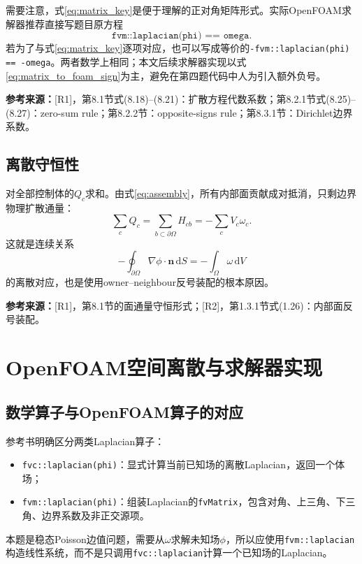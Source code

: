 \documentclass[UTF8,12pt,a4paper]{ctexart}
\numberwithin{equation}{section}
\newcommand{\dd}{\,\mathrm d}
\newcommand{\Rone}{\textnormal{[R1]}}
\newcommand{\Rtwo}{\textnormal{[R2]}}
\newcommand{\source}[1]{%
  \par\smallskip
  \noindent\colorbox{sourcebg}{%
    \parbox{0.955\linewidth}{\footnotesize\color{sourcegray}\textbf{参考来源：}#1}%
  }
  \par\smallskip
}
\begin{document}
需要注意，式\eqref{eq:matrix_key}是便于理解的正对角矩阵形式。实际OpenFOAM求解器推荐直接写题目原方程
\begin{equation}
  \texttt{fvm::laplacian(phi) == omega}.
  \label{eq:matrix_to_foam_sign}
\end{equation}
若为了与式\eqref{eq:matrix_key}逐项对应，也可以写成等价的\texttt{-fvm::laplacian(phi) == -omega}。两者数学上相同；本文后续求解器实现以式\eqref{eq:matrix_to_foam_sign}为主，避免在第四题代码中人为引入额外负号。

\source{\Rone，第8.1节式(8.18)--(8.21)：扩散方程代数系数；第8.2.1节式(8.25)--(8.27)：zero-sum rule；第8.2.2节：opposite-signs rule；第8.3.1节：Dirichlet边界系数。}

\subsection{离散守恒性}

对全部控制体的$Q_c$求和。由式\eqref{eq:assembly}，所有内部面贡献成对抵消，只剩边界物理扩散通量：
\begin{equation}
  \sum_cQ_c
  =\sum_{b\subset\partial\Omega}H_{cb}
  =-\sum_cV_c\omega_c.
  \label{eq:global_conservation}
\end{equation}
这就是连续关系
\begin{equation}
  -\oint_{\partial\Omega}\nabla\phi\cdot\bm n\dd S
  =-\int_\Omega\omega\dd V
\end{equation}
的离散对应，也是使用owner--neighbour反号装配的根本原因。

\source{\Rone，第8.1节的面通量守恒形式；\Rtwo，第1.3.1节式(1.26)：内部面反号装配。}

\newpage
\section{OpenFOAM空间离散与求解器实现}

\subsection{数学算子与OpenFOAM算子的对应}

参考书明确区分两类Laplacian算子：
\begin{itemize}
  \item \texttt{fvc::laplacian(phi)}：显式计算当前已知场的离散Laplacian，返回一个体场；
  \item \texttt{fvm::laplacian(phi)}：组装Laplacian的\texttt{fvMatrix}，包含对角、上三角、下三角、边界系数及非正交源项。
\end{itemize}
本题是稳态Poisson边值问题，需要从$\omega$求解未知场$\phi$，所以应使用\texttt{fvm::laplacian}构造线性系统，而不是只调用\texttt{fvc::laplacian}计算一个已知场的Laplacian。
\end{document}
